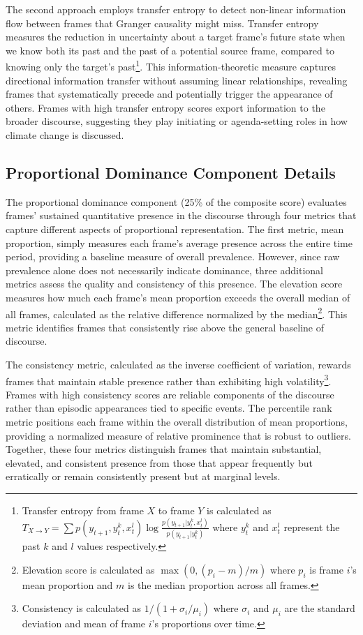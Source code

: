 \documentclass[12pt]{article}
\begin{document}
The second approach employs transfer entropy to detect non-linear information flow between frames that Granger causality might miss. Transfer entropy measures the reduction in uncertainty about a target frame's future state when we know both its past and the past of a potential source frame, compared to knowing only the target's past\footnote{Transfer entropy from frame $X$ to frame $Y$ is calculated as $T_{X \to Y} = \sum p(y_{t+1}, y_t^k, x_t^l) \log \frac{p(y_{t+1}|y_t^k, x_t^l)}{p(y_{t+1}|y_t^k)}$ where $y_t^k$ and $x_t^l$ represent the past $k$ and $l$ values respectively.}. This information-theoretic measure captures directional information transfer without assuming linear relationships, revealing frames that systematically precede and potentially trigger the appearance of others. Frames with high transfer entropy scores export information to the broader discourse, suggesting they play initiating or agenda-setting roles in how climate change is discussed.

\subsection{Proportional Dominance Component Details}

The proportional dominance component (25\% of the composite score) evaluates frames' sustained quantitative presence in the discourse through four metrics that capture different aspects of proportional representation. The first metric, mean proportion, simply measures each frame's average presence across the entire time period, providing a baseline measure of overall prevalence. However, since raw prevalence alone does not necessarily indicate dominance, three additional metrics assess the quality and consistency of this presence. The elevation score measures how much each frame's mean proportion exceeds the overall median of all frames, calculated as the relative difference normalized by the median\footnote{Elevation score is calculated as $\max(0, (p_i - m) / m)$ where $p_i$ is frame $i$'s mean proportion and $m$ is the median proportion across all frames.}. This metric identifies frames that consistently rise above the general baseline of discourse.

The consistency metric, calculated as the inverse coefficient of variation, rewards frames that maintain stable presence rather than exhibiting high volatility\footnote{Consistency is calculated as $1/(1 + \sigma_i/\mu_i)$ where $\sigma_i$ and $\mu_i$ are the standard deviation and mean of frame $i$'s proportions over time.}. Frames with high consistency scores are reliable components of the discourse rather than episodic appearances tied to specific events. The percentile rank metric positions each frame within the overall distribution of mean proportions, providing a normalized measure of relative prominence that is robust to outliers. Together, these four metrics distinguish frames that maintain substantial, elevated, and consistent presence from those that appear frequently but erratically or remain consistently present but at marginal levels.
\end{document}
